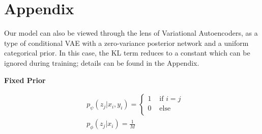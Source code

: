 \documentclass{article}
\begin{document}
%
%
%
%
%
%


\section{Appendix}

Our model can also be viewed through the lens of Variational Autoencoders, as a type of conditional VAE with a zero-variance posterior network and a uniform categorical prior.
In this case, the KL term reduces to a constant which can be ignored during training; details can be found in the Appendix.

\textbf{Fixed Prior}

\begin{align}
  &p_\psi(z_j | x_i, y_i) =
  \begin{cases}
    1 & \mbox{ if } i = j \\
    0 & \mbox{ else } \\
  \end{cases} \\
  &p_\phi(z_j | x_i) = \frac{1}{M}
  \\
\end{align}
\end{document}
